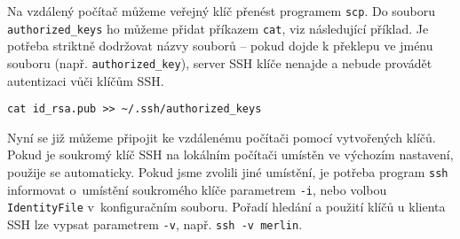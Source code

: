 Na vzdálený počítač můžeme veřejný klíč přenést programem {\tt scp}. Do souboru {\tt authorized\_keys} ho můžeme přidat příkazem {\tt cat}, viz následující příklad. Je potřeba striktně dodržovat názvy souborů -- pokud dojde k překlepu ve jménu souboru (např. {\tt authorized\_key}), server SSH klíče nenajde a nebude provádět autentizaci vůči klíčům SSH. 
\begin{verbatim}
cat id_rsa.pub >> ~/.ssh/authorized_keys
\end{verbatim}

Nyní se již můžeme připojit ke vzdálenému počítači pomocí vytvořených klíčů. Pokud je soukromý klíč SSH na lokálním počítači umístěn ve výchozím nastavení, použije se automaticky. Pokud jsme  zvolili jiné umístění, je potřeba program {\tt ssh} informovat o~umístění soukromého klíče parametrem  {\tt -i}, nebo volbou {\tt IdentityFile} v~konfiguračním souboru. Pořadí hledání a použití klíčů u klienta SSH lze vypsat parametrem {\tt -v}, např. {\tt ssh -v merlin}.


